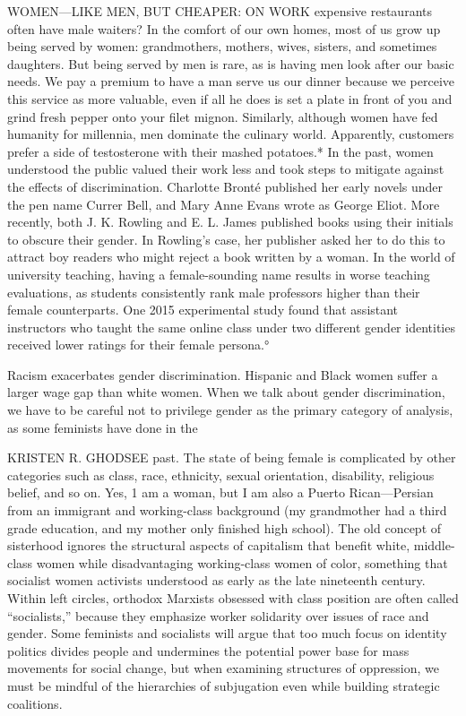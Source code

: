 WOMEN—LIKE MEN, BUT CHEAPER: ON WORK expensive restaurants often have male waiters? In the comfort of our own homes, most of us grow up being served by women: grandmothers, mothers, wives, sisters, and sometimes daughters. But being served by men is rare, as is having men look after our basic needs. We pay a premium to have a man serve us our dinner because we perceive this service as more valuable, even if all he does is set a plate in front of you and grind fresh pepper onto your filet mignon. Similarly, although women have fed humanity for millennia, men dominate the culinary world. Apparently, customers prefer a side of testosterone with their mashed potatoes.* In the past, women understood the public valued their work less and took steps to mitigate against the effects of discrimination. Charlotte Bronté published her early novels under the pen name Currer Bell, and Mary Anne Evans wrote as George Eliot. More recently, both J. K. Rowling and E. L. James published books using their initials to obscure their gender. In Rowling’s case, her publisher asked her to do this to attract boy readers who might reject a book written by a woman. In the world of university teaching, having a female-sounding name results in worse teaching evaluations, as students consistently rank male professors higher than their female counterparts. One 2015 experimental study found that assistant instructors who taught the same online class under two different gender identities received lower ratings for their female persona.°
 \par 
Racism exacerbates gender discrimination. Hispanic and Black women suffer a larger wage gap than white women. When we talk about gender discrimination, we have to be careful not to privilege gender as the primary category of analysis, as some feminists have done in the
 \par 
KRISTEN R. GHODSEE past. The state of being female is complicated by other categories such as class, race, ethnicity, sexual orientation, disability, religious belief, and so on. Yes, {\color{blue}1} am a woman, but I am also a Puerto Rican—Persian from an immigrant and working-class background (my grandmother had a third grade education, and my mother only finished high school). The old concept of sisterhood ignores the structural aspects of capitalism that benefit white, middle-class women while disadvantaging working-class women of color, something that socialist women activists understood as early as the late nineteenth century. Within left circles, orthodox Marxists obsessed with class position are often called “socialists,” because they emphasize worker solidarity over issues of race and gender. Some feminists and socialists will argue that too much focus on identity politics divides people and undermines the potential power base for mass movements for social change, but when examining structures of oppression, we must be mindful of the hierarchies of subjugation even while building strategic coalitions.
